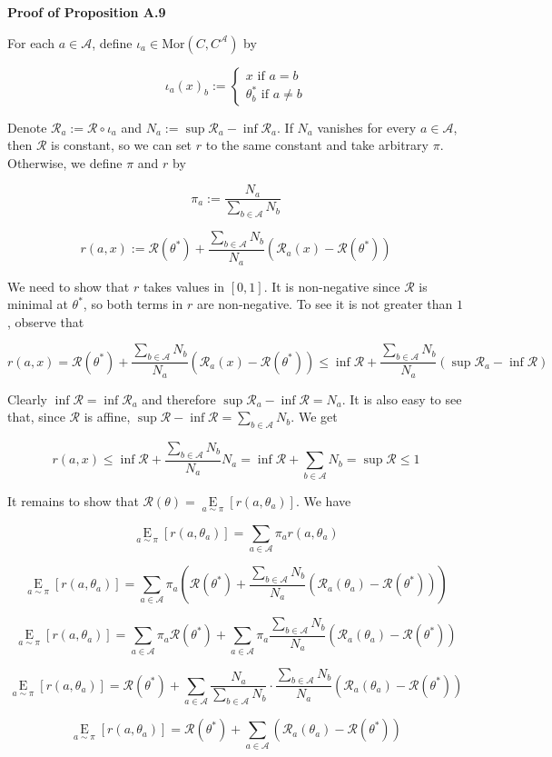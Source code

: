 \documentclass[a4paper]{article}
\newcommand{\Co}[1]{}
\newcommand{\AP}[1]{\left(#1\right)}
\newcommand{\AB}[1]{\left[#1\right]}
\newcommand{\Ea}[2]{\underset{#1}{\operatorname{E}}\AB{#2}}
\newcommand{\Mor}{\mathrm{Mor}}
\newcommand{\A}{\mathcal{A}}
\newcommand{\R}{\mathcal{R}}
\begin{document}
\textbf{Proof of Proposition A.9}\Co{b}

For each $a\in\A$, define $\iota_a\in\Mor\AP{C,C^\A}$ by

$$\iota_a(x)_b:=\begin{cases} x \text{ if } a=b \\ \theta^*_b \text{ if } a\ne b\end{cases}$$

Denote $\R_a:=\R\circ\iota_a$ and $N_a:=\sup\R_a-\inf\R_a$. If $N_a$ vanishes for every $a\in\A$, then $\R$ is constant, so we can set $r$ to the same constant and take arbitrary $\pi$. Otherwise, we define $\pi$ and $r$ by

$$\pi_a:=\frac{N_a}{\sum_{b\in\A}N_b}$$

$$r(a,x):=\R\AP{\theta^*} +\frac{\sum_{b\in\A}N_b}{N_a}\AP{\R_a(x)-\R\AP{\theta^*}}$$

We need to show that $r$ takes values in $[0,1]$. It is non-negative since $\R$ is minimal at $\theta^*$, so both terms in $r$ are non-negative. To see it is not greater than $1$, observe that

$$r(a,x)=\R\AP{\theta^*} +\frac{\sum_{b\in\A}N_b}{N_a}\AP{\R_a(x)-\R\AP{\theta^*}}\leq\inf\R +\frac{\sum_{b\in\A}N_b}{N_a}\AP{\sup\R_a-\inf\R}$$

Clearly $\inf\R=\inf\R_a$ and therefore $\sup\R_a-\inf\R=N_a$. It is also easy to see that, since $\R$ is affine, $\sup\R-\inf\R=\sum_{b\in\A}N_b$. We get

$$r(a,x)\leq\inf\R+\frac{\sum_{b\in\A}N_b}{N_a}N_a=\inf\R+\sum_{b\in\A}N_b=\sup\R\leq 1$$

It remains to show that $\R(\theta)=\Ea{a\sim\pi}{r\AP{a,\theta_a}}$. We have

$$\Ea{a\sim\pi}{r\AP{a,\theta_a}}=\sum_{a\in\A}\pi_ar\AP{a,\theta_a}$$

$$\Ea{a\sim\pi}{r\AP{a,\theta_a}}=\sum_{a\in\A}\pi_a\AP{\R\AP{\theta^*} +\frac{\sum_{b\in\A}N_b}{N_a}\AP{\R_a\AP{\theta_a}-\R\AP{\theta^*}}}$$

$$\Ea{a\sim\pi}{r\AP{a,\theta_a}}=\sum_{a\in\A}\pi_a\R\AP{\theta^*} +\sum_{a\in\A}\pi_a{\frac{\sum_{b\in\A}N_b}{N_a}\AP{\R_a\AP{\theta_a}-\R\AP{\theta^*}}}$$

$$\Ea{a\sim\pi}{r\AP{a,\theta_a}}=\R\AP{\theta^*} +\sum_{a\in\A}\frac{N_a}{\sum_{b\in\A}N_b}\cdot{\frac{\sum_{b\in\A}N_b}{N_a}\AP{\R_a\AP{\theta_a}-\R\AP{\theta^*}}}$$

$$\Ea{a\sim\pi}{r\AP{a,\theta_a}}=\R\AP{\theta^*} +\sum_{a\in\A}\AP{\R_a\AP{\theta_a}-\R\AP{\theta^*}}$$
\end{document}
